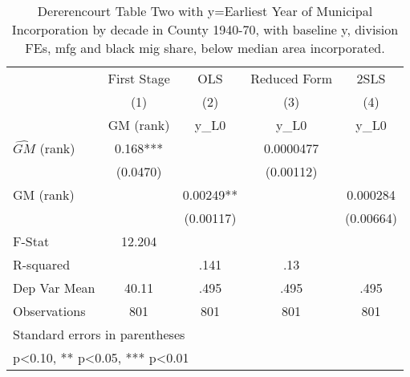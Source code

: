 \begin{table}[htbp]\centering
\def\sym#1{\ifmmode^{#1}\else\(^{#1}\)\fi}
\caption{Dererencourt Table Two with y=Earliest Year of Municipal Incorporation by decade in County 1940-70, with baseline y, division FEs, mfg and black mig share, below median area incorporated.}
\begin{tabular}{l*{4}{c}}
\toprule
                    & First Stage   &         OLS   &Reduced Form   &        2SLS   \\
                    &\multicolumn{1}{c}{(1)}&\multicolumn{1}{c}{(2)}&\multicolumn{1}{c}{(3)}&\multicolumn{1}{c}{(4)}\\
                    &\multicolumn{1}{c}{GM  (rank)}&\multicolumn{1}{c}{y\_L0}&\multicolumn{1}{c}{y\_L0}&\multicolumn{1}{c}{y\_L0}\\
\midrule
$\hat{GM}$ (rank)   &       0.168***&               &   0.0000477   &               \\
                    &    (0.0470)   &               &   (0.00112)   &               \\
\addlinespace
GM  (rank)          &               &     0.00249** &               &    0.000284   \\
                    &               &   (0.00117)   &               &   (0.00664)   \\
\midrule
F-Stat              &      12.204   &               &               &               \\
R-squared           &               &        .141   &         .13   &               \\
Dep Var Mean        &       40.11   &        .495   &        .495   &        .495   \\
Observations        &         801   &         801   &         801   &         801   \\
\bottomrule
\multicolumn{5}{l}{\footnotesize Standard errors in parentheses}\\
\multicolumn{5}{l}{\footnotesize * p<0.10, ** p<0.05, *** p<0.01}\\
\end{tabular}
\end{table}
